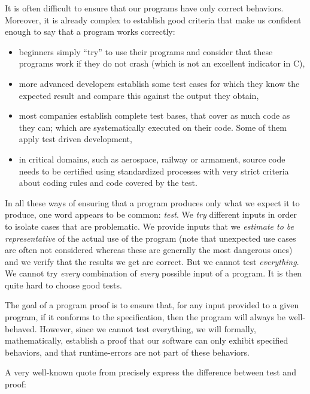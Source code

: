 

It is often difficult to ensure that our programs have only correct
behaviors. Moreover, it is already complex to establish good criteria
that make us confident enough to say that a program works correctly:
\begin{itemize}
\item
  beginners simply ``try'' to use their programs and consider that
  these programs work if they do not crash (which is not an excellent
  indicator in C),
\item
  more advanced developers establish some test cases for which they know
  the expected result and compare this against the output they obtain,
\item
  most companies establish complete test bases, that cover as much
  code as they can; which are systematically executed on their code.
  Some of them apply test driven development,
\item
  in critical domains, such as aerospace, railway or armament, source
  code needs to be certified using standardized processes with very
  strict criteria about coding rules and code covered by the test.
\end{itemize}

In all these ways of ensuring that a program produces only what we expect
it to produce, one word appears to be common: \emph{test}. We \emph{try}
different inputs in order to isolate cases that are problematic. We
provide inputs that we \emph{estimate to be representative} of the
actual use of the program (note that unexpected use cases are often not
considered whereas these are generally the most dangerous ones) and we
verify that the results we get are correct. But we cannot test
\emph{everything}. We cannot try \emph{every} combination of
\emph{every} possible input of a program. It is then quite hard to
choose good tests.


The goal of a program proof is to ensure that, for any input provided to a
given program, if it conforms to the specification, then the program will
always be well-behaved. However, since we cannot test everything, we will
formally, mathematically, establish a proof that our software can only
exhibit specified behaviors, and that runtime-errors are not part of
these behaviors.



A very well-known quote from 
precisely express the difference between test and proof:



